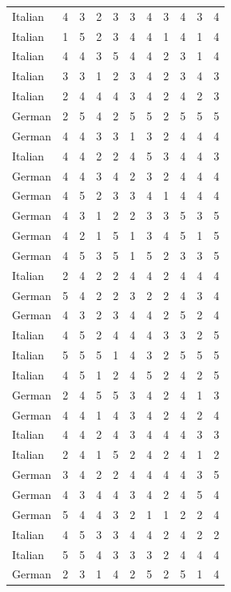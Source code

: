 \begin{table}[htbp]
\begin{tabular}{lcccccccccc}
Italian & 4 & 3 & 2 & 3 & 3 & 4 & 3 & 4 & 3 & 4 \\
Italian & 1 & 5 & 2 & 3 & 4 & 4 & 1 & 4 & 1 & 4 \\
Italian & 4 & 4 & 3 & 5 & 4 & 4 & 2 & 3 & 1 & 4 \\
Italian & 3 & 3 & 1 & 2 & 3 & 4 & 2 & 3 & 4 & 3 \\
Italian & 2 & 4 & 4 & 4 & 3 & 4 & 2 & 4 & 2 & 3 \\
German & 2 & 5 & 4 & 2 & 5 & 5 & 2 & 5 & 5 & 5 \\
German & 4 & 4 & 3 & 3 & 1 & 3 & 2 & 4 & 4 & 4 \\
Italian & 4 & 4 & 2 & 2 & 4 & 5 & 3 & 4 & 4 & 3 \\
German & 4 & 4 & 3 & 4 & 2 & 3 & 2 & 4 & 4 & 4 \\
German & 4 & 5 & 2 & 3 & 3 & 4 & 1 & 4 & 4 & 4 \\
German & 4 & 3 & 1 & 2 & 2 & 3 & 3 & 5 & 3 & 5 \\
German & 4 & 2 & 1 & 5 & 1 & 3 & 4 & 5 & 1 & 5 \\
German & 4 & 5 & 3 & 5 & 1 & 5 & 2 & 3 & 3 & 5 \\
Italian & 2 & 4 & 2 & 2 & 4 & 4 & 2 & 4 & 4 & 4 \\
German & 5 & 4 & 2 & 2 & 3 & 2 & 2 & 4 & 3 & 4 \\
German & 4 & 3 & 2 & 3 & 4 & 4 & 2 & 5 & 2 & 4 \\
Italian & 4 & 5 & 2 & 4 & 4 & 4 & 3 & 3 & 2 & 5 \\
Italian & 5 & 5 & 5 & 1 & 4 & 3 & 2 & 5 & 5 & 5 \\
Italian & 4 & 5 & 1 & 2 & 4 & 5 & 2 & 4 & 2 & 5 \\
German & 2 & 4 & 5 & 5 & 3 & 4 & 2 & 4 & 1 & 3 \\
German & 4 & 4 & 1 & 4 & 3 & 4 & 2 & 4 & 2 & 4 \\
Italian & 4 & 4 & 2 & 4 & 3 & 4 & 4 & 4 & 3 & 3 \\
Italian & 2 & 4 & 1 & 5 & 2 & 4 & 2 & 4 & 1 & 2 \\
German & 3 & 4 & 2 & 2 & 4 & 4 & 4 & 4 & 3 & 5 \\
German & 4 & 3 & 4 & 4 & 3 & 4 & 2 & 4 & 5 & 4 \\
German & 5 & 4 & 4 & 3 & 2 & 1 & 1 & 2 & 2 & 4 \\
Italian & 4 & 5 & 3 & 3 & 4 & 4 & 2 & 4 & 2 & 2 \\
Italian & 5 & 5 & 4 & 3 & 3 & 3 & 2 & 4 & 4 & 4 \\
German & 2 & 3 & 1 & 4 & 2 & 5 & 2 & 5 & 1 & 4 \\

\end{tabular}
\end{table}
